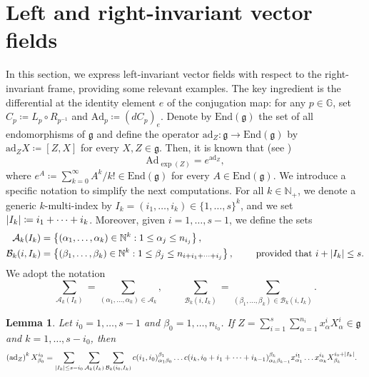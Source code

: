 \documentclass[11pt]{amsart}
\DeclarePairedDelimiter{\abs}{\lvert}{\rvert}
\theoremstyle{plain}
\newtheorem{lemma}[theorem]{Lemma}
\theoremstyle{definition}
\theoremstyle{remark}
\numberwithin{equation}{section}
\begin{document}
\section{Left and right-invariant vector fields} \label{sec_left_right}
In this section, we express left-invariant vector fields with respect to the right-invariant frame, providing some relevant examples. The key ingredient is the differential at the identity element $e$ of the conjugation map: for any $p \in \mathbb{G}$, set $C_p \coloneqq L_p \circ R_{p^{-1}}$ and $\mathrm{Ad}_p \coloneqq \left(d C_p\right)_e$. Denote by $\mathrm{End}(\mathfrak{g})$ the set of all endomorphisms of $\mathfrak{g}$ and define the operator $\mathrm{ad}_Z: \mathfrak{g} \to \mathrm{End}(\mathfrak{g})$ by $\mathrm{ad}_Z X \coloneqq [Z,X]$ for every $X,Z \in \mathfrak{g}$. Then, it is known that (see \cite[Proposition 1.91]{MR1920389})
\begin{equation} \label{eq_adjoint_exponential}
\mathrm{Ad}_{\exp(Z)} = e^{\mathrm{ad}_Z},
\end{equation}
where $e^A \coloneqq \sum_{k=0}^\infty A^k/k! \in \mathrm{End}(\mathfrak{g})$ for every $A \in \mathrm{End}(\mathfrak{g})$. We introduce a specific notation to simplify the next computations. For all $k \in \mathbb{N}_+$, we denote a generic $k$-multi-index by $I_k=(i_1,\dots,i_k) \in \{1,\dots,s\}^k$, and we set $\abs*{I_k} \coloneqq i_1+\dots+i_k$. Moreover, given $i=1,\dots,s-1$, we define the sets
\begin{equation} \label{eq_notation_multi-index}
\begin{split}
    \mathcal A_k(I_k) & = \left\{(\alpha_1,\dots,\alpha_k) \in \mathbb{N}^k : 1 \leq \alpha_j \leq n_{i_j} \right\},\\
    \mathcal B_k(i,I_k) & = \left\{(\beta_1,\dots,\beta_k) \in \mathbb{N}^k : 1 \leq \beta_j \leq n_{i+i_1+\dots+i_j} \right\}, \qquad \text{ provided that $i+\abs*{I_k} \leq s$.}
\end{split}
\end{equation}
We adopt the notation
\begin{equation*}
\sum_{\mathcal A_k(I_k)} = \sum_{(\alpha_1,\dots,\alpha_k) \in \mathcal A_k}, \qquad \sum_{\mathcal B_k(i,I_k)} = \sum_{(\beta_1,\dots,\beta_k) \in \mathcal B_k(i,I_k)}.
\end{equation*}
\begin{lemma}
Let $i_0=1,\dots,s-1$ and $\beta_0=1,\dots,n_{i_0}$. If $Z=\displaystyle \sum_{i=1}^s \sum_{\alpha=1}^{n_i} x^i_\alpha X^i_\alpha \in \mathfrak{g}$ and $k=1,\dots,s-i_0$, then
\begin{equation} \label{eq_iterated_adjoint}
\begin{split}
\left(\mathrm{ad}_Z\right)^k X^{i_0}_{\beta_0} & = \sum_{\abs*{I_k} \leq s-i_0} \sum_{\mathcal A_k(I_k)} \sum_{\mathcal B_k(i_0,I_k)} c(i_1,i_0)^{\beta_1}_{\alpha_1 \beta_0} \dots c(i_k,i_0+i_1+\dots+i_{k-1})^{\beta_k}_{\alpha_k \beta_{k-1}} x^{i_1}_{\alpha_1} \dots x^{i_k}_{\alpha_k} X^{i_0+\abs*{I_k}}_{\beta_k}.
\end{split}
\end{equation}
\end{lemma}
\end{document}
